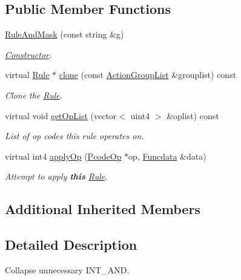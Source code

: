 \subsection*{Public Member Functions}
\begin{DoxyCompactItemize}
\item 
\mbox{\hyperlink{class_rule_and_mask_a4a3eed1a014056ce405bf553e343d42a}{Rule\+And\+Mask}} (const string \&g)
\begin{DoxyCompactList}\small\item\em \mbox{\hyperlink{class_constructor}{Constructor}}. \end{DoxyCompactList}\item 
virtual \mbox{\hyperlink{class_rule}{Rule}} $\ast$ \mbox{\hyperlink{class_rule_and_mask_a0d8910f37dde4f7ee748e529f174f332}{clone}} (const \mbox{\hyperlink{class_action_group_list}{Action\+Group\+List}} \&grouplist) const
\begin{DoxyCompactList}\small\item\em Clone the \mbox{\hyperlink{class_rule}{Rule}}. \end{DoxyCompactList}\item 
virtual void \mbox{\hyperlink{class_rule_and_mask_a787f3bb11488a68584a55ef1fe378be7}{get\+Op\+List}} (vector$<$ uint4 $>$ \&oplist) const
\begin{DoxyCompactList}\small\item\em List of op codes this rule operates on. \end{DoxyCompactList}\item 
virtual int4 \mbox{\hyperlink{class_rule_and_mask_a366c5419fa1fb118d35b7f9794d72e47}{apply\+Op}} (\mbox{\hyperlink{class_pcode_op}{Pcode\+Op}} $\ast$op, \mbox{\hyperlink{class_funcdata}{Funcdata}} \&data)
\begin{DoxyCompactList}\small\item\em Attempt to apply {\bfseries{this}} \mbox{\hyperlink{class_rule}{Rule}}. \end{DoxyCompactList}\end{DoxyCompactItemize}
\subsection*{Additional Inherited Members}


\subsection{Detailed Description}
Collapse unnecessary I\+N\+T\+\_\+\+A\+ND. 


